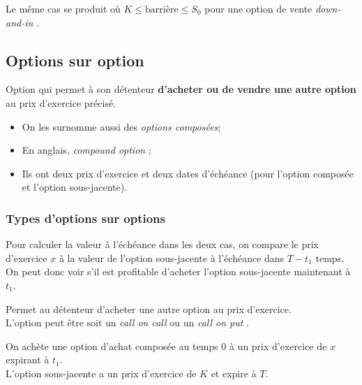 \documentclass[10pt, french]{article}
\begin{document}
\begin{multicols*}{2}
Le même cas se produit où $K \leq \text{barrière} \leq S_{0}$ pour une option de vente \og \textit{down-and-in} \fg{}.


\columnbreak
\subsection*{Options sur option}
\begin{definitionNOHFILL}
Option qui permet à son détenteur \textbf{d'acheter ou de vendre une autre option} au prix d'exercice précisé.

\tcbline

\begin{itemize}[leftmargin = *]
	\item	On les surnomme aussi des \textit{options composées};
	\item	En anglais, \og \textit{compound option} \fg{};
	\item	Ils ont deux prix d'exercice et deux dates d'échéance (pour l'option composée et l'option sous-jacente).
\end{itemize}
\end{definitionNOHFILL}

\subsubsection*{Types d'options sur options}
Pour calculer la valeur à l'échéance dans les deux cas, on compare le prix d'exercice $x$ à la valeur de l'option sous-jacente à l'échéance dans $T - t_{1}$ temps. On peut donc voir s'il est profitable d'acheter l'option sous-jacente maintenant à $t_{1}$.

\begin{definitionNOHFILLsub}
Permet au détenteur d'acheter une autre option au prix d'exercice.\\
L'option peut être soit un \og \textit{call on call} \fg{} ou un \og \textit{call on put} \fg{}.

\tcbline

On achète une option d'achat composée au temps 0 à un prix d'exercice de $x$ expirant à $t_{1}$.\\ L'option sous-jacente a un prix d'exercice de $K$ et expire à $T$.
\begin{center}


\begin{tikzpicture}[x=0.75pt,y=0.75pt,yscale=-1,xscale=1]


\end{tikzpicture}
\end{center}
\end{definitionNOHFILLsub}
\end{multicols*}
\end{document}
